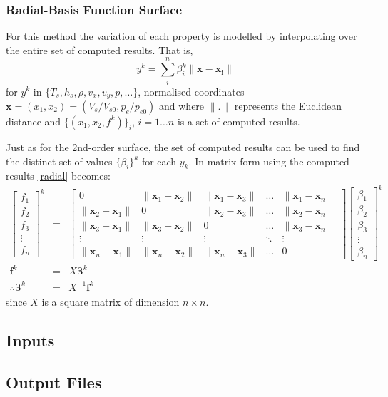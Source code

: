 \subsubsection{Radial-Basis Function Surface}
For this method the variation of each property is modelled by interpolating over the entire set of computed results. That is,
\begin{equation}
y^k = \sum_i^n{\beta_i^k \parallel \mathbf{x} - \mathbf{x_i} \parallel}
\label{radial}
\end{equation}
for $y^k$ in $\lbrace T_s, h_s, \rho, v_x, v_y, p, \dots \rbrace$, normalised coordinates $\mathbf{x} = (x_1, x_2) = (V_s/V_{s0}, p_e/p_{e0})$ and where $\parallel . \parallel$ represents the Euclidean distance and $\lbrace (x_1, x_2, f^k) \rbrace_i$, $i = 1 \dots n$ is a set of computed results. 

Just as for the 2nd-order surface, the set of computed results can be used to find the distinct set of values $\lbrace \beta_i \rbrace^k$ for each $y_k$. In matrix form using the computed results \cref{radial} becomes:
\begin{eqnarray}
\begin{bmatrix} f_1 \\ f_2 \\ f_3 \\ \vdots \\ f_n \end{bmatrix}^k &=& \begin{bmatrix} 0 & \parallel\mathbf{x}_1-\mathbf{x}_2\parallel & \parallel\mathbf{x}_1-\mathbf{x}_3\parallel & \dots & \parallel\mathbf{x}_1-\mathbf{x}_n\parallel \\ \parallel\mathbf{x}_2-\mathbf{x}_1\parallel & 0 & \parallel\mathbf{x}_2-\mathbf{x}_3\parallel & \dots & \parallel\mathbf{x}_2-\mathbf{x}_n\parallel \\ \parallel\mathbf{x}_3-\mathbf{x}_1\parallel & \parallel\mathbf{x}_3-\mathbf{x}_2\parallel & 0 & \dots & \parallel\mathbf{x}_3-\mathbf{x}_n\parallel \\ \vdots & \vdots & \vdots & \ddots & \vdots \\ \parallel\mathbf{x}_n-\mathbf{x}_1\parallel & \parallel\mathbf{x}_n-\mathbf{x}_2\parallel & \parallel\mathbf{x}_n-\mathbf{x}_3\parallel & \dots & 0 \end{bmatrix} \begin{bmatrix} \beta_1 \\ \beta_2 \\ \beta_3 \\ \vdots \\ \beta_n \end{bmatrix}^k \\
\mathbf{f}^k &=& X \boldsymbol{\beta}^k \nonumber \\
\therefore \boldsymbol{\beta}^k &=& X^{-1}\mathbf{f}^k 
\end{eqnarray}
since $X$ is a square matrix of dimension $n\times n$.

\subsection{Inputs}

\subsection{Output Files}